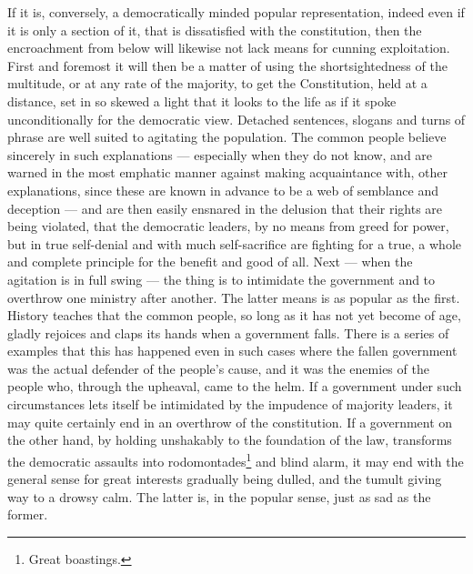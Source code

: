 \documentclass[12pt,a4paper,openany]{book}
\newcommand{\opage}[1]{\marginnote{\footnotesize\textit{[#1]}}}
\begin{document}
If it is, conversely, a democratically minded popular representation,
indeed even if it is only a section of it,
that is dissatisfied with the constitution, then the encroachment
from below will likewise not lack means for cunning exploitation.
First and foremost it will then be a matter of
using the shortsightedness of the multitude, or at any rate of the majority,
to get the Constitution, held at a distance, set in
so skewed a light that it looks to the life as
if it spoke unconditionally for the democratic view.
Detached sentences, slogans and turns of phrase are well
suited to agitating the population. The common
people believe sincerely in such explanations --- especially when
they do not know, and are warned in the most emphatic manner
against making acquaintance with, other explanations,
since these are known in advance to be a web of
semblance and deception --- and are then easily ensnared in the delusion
that their rights are being violated, that the democratic leaders,
by no means from greed for power, but in true
self-denial and with much self-sacrifice are fighting for a
true, a whole and complete principle for the benefit and
good of all. Next --- when the agitation is in full
swing --- the thing is to intimidate the government and
\setcounter{footnote}{0}%
\opage{29}to overthrow one ministry after another. The latter
means is as popular as the first. History
teaches that the common people, so long as it has not yet
become of age, gladly rejoices and claps its hands
when a government falls. There is a series of
examples that this has happened even in such
cases where the fallen government was the actual
defender of the people's cause, and it was the enemies of the people who, through
the upheaval, came to the helm. If a government under
such circumstances lets itself be intimidated by the
impudence of majority leaders, it may quite certainly end in
an overthrow of the constitution. If a government on the other hand,
by holding unshakably to the foundation of the law,
transforms the democratic assaults into rodomontades\footnote{Great boastings.}
and blind alarm, it may end with the general
sense for great interests gradually being dulled, and the tumult
giving way to a drowsy calm. The latter is, in the popular
sense, just as sad as the former.
\end{document}
